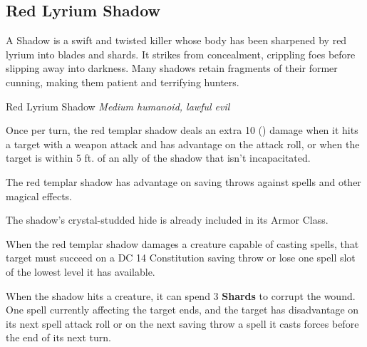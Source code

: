 \documentclass{apotheosis-book}
\begin{document}
\newpage

\subsection{Red Lyrium Shadow}

A Shadow is a swift and twisted killer whose body has been sharpened by red lyrium into blades and shards. It strikes from concealment, crippling foes before slipping away into darkness. Many shadows retain fragments of their former cunning, making them patient and terrifying hunters.

\begin{monsterbox}{Red Lyrium Shadow}
\textit{Medium humanoid, lawful evil}\\
\rpghline
\basics[
  armorclass = 15 (lyrium hide),
  hitpoints = 30,
  speed = 45 ft.
]
\rpghline
\stats[
  STR = \stat{16},
  DEX = \stat{20},
  CON = \stat{12},
  INT = \stat{12},
  WIS = \stat{14},
  CHA = \stat{10}
]
\rpghline
\details[
  skills = Investigation +2, Religion +2, Perception +4, Stealth +9,
  senses = passive Perception 14,
  languages = Common,
  challenge = 6
]
\rpghline

\begin{rpg-monsteraction}[Backstab]
Once per turn, the red templar shadow deals an extra 10 () damage when it hits a target with a weapon attack and has advantage on the attack roll, or when the target is within 5 ft. of an ally of the shadow that isn't incapacitated.
\end{rpg-monsteraction}

\begin{rpg-monsteraction}
The red templar shadow has advantage on saving throws against spells and other magical effects.
\end{rpg-monsteraction}

\begin{rpg-monsteraction}
The shadow's crystal-studded hide is already included in its Armor Class.
\end{rpg-monsteraction}

\begin{rpg-monsteraction}
When the red templar shadow damages a creature capable of casting spells, that target must succeed on a DC 14 Constitution saving throw or lose one spell slot of the lowest level it has available.
\end{rpg-monsteraction}

\begin{rpg-monsteraction}
When the shadow hits a creature, it can spend 3 \textbf{Shards} to corrupt the wound. One spell currently affecting the target ends, and the target has disadvantage on its next spell attack roll or on the next saving throw a spell it casts forces before the end of its next turn.
\end{rpg-monsteraction}


\end{monsterbox}
\end{document}
